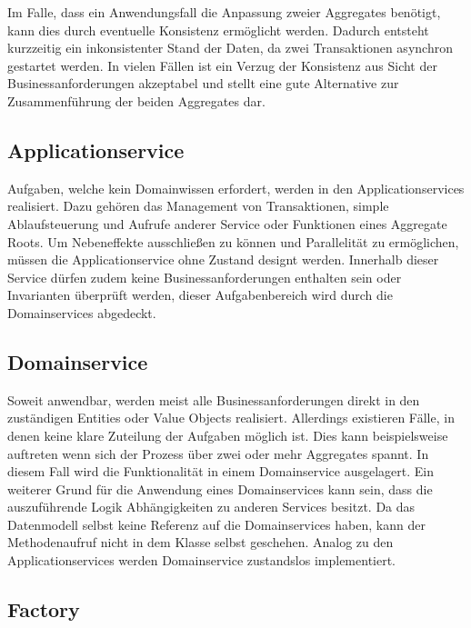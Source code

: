 
Im Falle, dass ein Anwendungsfall die Anpassung zweier Aggregates benötigt, kann dies durch eventuelle Konsistenz ermöglicht werden. Dadurch entsteht kurzzeitig ein inkonsistenter Stand der Daten, da zwei Transaktionen asynchron gestartet werden. In vielen Fällen ist ein Verzug der Konsistenz aus Sicht der Businessanforderungen akzeptabel und stellt eine gute Alternative zur Zusammenführung der beiden Aggregates dar.



\subsection{Applicationservice}

Aufgaben, welche kein Domainwissen erfordert, werden in den Applicationservices realisiert. Dazu gehören das Management von Transaktionen, simple Ablaufsteuerung und Aufrufe anderer Service oder Funktionen eines Aggregate Roots. Um Nebeneffekte ausschließen zu können und Parallelität zu ermöglichen, müssen die Applicationservice ohne Zustand designt werden. Innerhalb dieser Service dürfen zudem keine Businessanforderungen enthalten sein oder Invarianten überprüft werden, dieser Aufgabenbereich wird durch die Domainservices abgedeckt.

\subsection{Domainservice}

Soweit anwendbar, werden meist alle Businessanforderungen direkt in den  zuständigen Entities oder Value Objects realisiert. Allerdings existieren Fälle, in denen keine klare Zuteilung der Aufgaben möglich ist. Dies kann beispielsweise auftreten wenn sich der Prozess über zwei oder mehr Aggregates spannt. In diesem Fall wird die Funktionalität in einem Domainservice ausgelagert. Ein weiterer Grund für die Anwendung eines Domainservices kann sein, dass die auszuführende Logik Abhängigkeiten zu anderen Services besitzt. Da das Datenmodell selbst keine Referenz auf die Domainservices haben, kann der Methodenaufruf nicht in dem Klasse selbst geschehen. Analog zu den Applicationservices werden Domainservice zustandslos implementiert.

\subsection{Factory}

